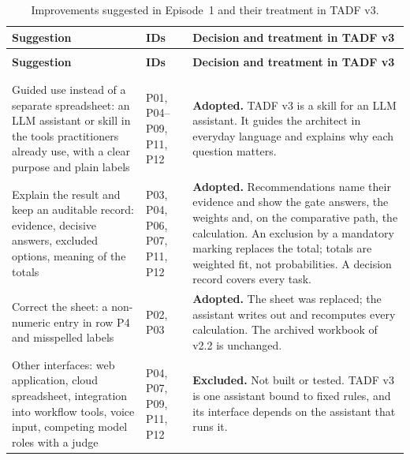 \begingroup
\renewcommand{\baselinestretch}{1}
\small
\setlength{\tabcolsep}{4pt}
\renewcommand{\arraystretch}{1.08}
\begin{longtable}{>{\raggedright\arraybackslash}p{} >{\raggedright\arraybackslash}p{} >{\raggedright\arraybackslash}p{}}
\caption[Improvements suggested in Episode~1 and their treatment in TADF v3]{Improvements suggested in Episode~1 and their treatment in TADF v3.}\label{tab:eval1-improvements} \\
\toprule
\textbf{Suggestion} & \textbf{IDs} & \textbf{Decision and treatment in TADF v3} \\
\midrule
\endfirsthead
\multicolumn{3}{l}{\tablename~\thetable{} (continued)} \\
\toprule
\textbf{Suggestion} & \textbf{IDs} & \textbf{Decision and treatment in TADF v3} \\
\midrule
\endhead
\midrule
\multicolumn{3}{r}{\emph{Continued on the next page.}} \\
\endfoot
\bottomrule
\endlastfoot
\multicolumn{3}{@{}l}{\textit{Delivery and presentation}} \\*
\addlinespace[2pt]
Guided use instead of a separate spreadsheet: an LLM assistant or skill in the tools practitioners already use, with a clear purpose and plain labels & P01, P04--P09, P11, P12 & \textbf{Adopted.} TADF v3 is a skill for an LLM assistant. It guides the architect in everyday language and explains why each question matters. \\
\addlinespace[2.5pt]
Explain the result and keep an auditable record: evidence, decisive answers, excluded options, meaning of the totals & P03, P04, P06, P07, P11, P12 & \textbf{Adopted.} Recommendations name their evidence and show the gate answers, the weights and, on the comparative path, the calculation. An exclusion by a mandatory marking replaces the total; totals are weighted fit, not probabilities. A decision record covers every task. \\
\addlinespace[2.5pt]
Correct the sheet: a non-numeric entry in row P4 and misspelled labels & P02, P03 & \textbf{Adopted.} The sheet was replaced; the assistant writes out and recomputes every calculation. The archived workbook of v2.2 is unchanged. \\
\addlinespace[2.5pt]
Other interfaces: web application, cloud spreadsheet, integration into workflow tools, voice input, competing model roles with a judge & P04, P07, P09, P11, P12 & \textbf{Excluded.} Not built or tested. TADF v3 is one assistant bound to fixed rules, and its interface depends on the assistant that runs it. \\

\end{longtable}

